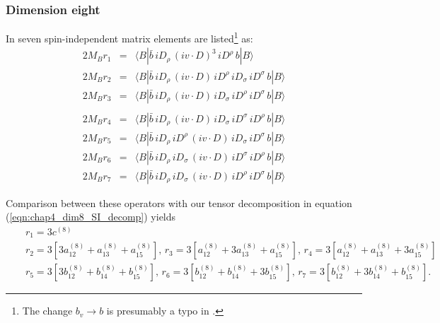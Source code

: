 \subsubsection{Dimension eight}\label{subsec:dim_8_SI_NRQCD}
\vspace{-0.2cm}
In \cite{Mannel:2010wj} seven spin-independent matrix elements are listed\footnote{The change $b_v\to b$ is presumably a typo in \cite{Mannel:2010wj}.} as:
\vspace{-0.4cm}
\begin{eqnarray}
2M_B r_1 &=& \langle B | \bar b \,i  D_\rho\, (i v \cdot D)^3\, i  D^\rho \, b | B \rangle\nonumber \\
2M_B r_2 &=& \langle B | \bar b \,i  D_\rho\, (i v \cdot D)\, i  D^\rho\, i  D_\sigma\, i  D^\sigma \, b | B \rangle\nonumber \\
\nonumber
2M_B r_3 &=& \langle B | \bar b \,i  D_\rho\, (i v \cdot D)\, i  D_\sigma\, i
D^\rho\, i  D^\sigma \, b | B \rangle\nonumber \\  
\nonumber
\end{eqnarray}
\begin{eqnarray}
2M_B r_4 &=& \langle B | \bar b \,i  D_\rho\, (i v \cdot D)\, i  D_\sigma\, i
D^\sigma\, i  D^\rho \, b | B \rangle\nonumber \\  
\nonumber
2M_B r_5 &=& \langle B | \bar b \,i  D_\rho\, i  D^\rho\,(i v \cdot D)\,  i
D_\sigma\, i  D^\sigma \, b | B \rangle \\  
\nonumber
2M_B r_6 &=& \langle B | \bar b \,i  D_\rho\, i  D_\sigma\, (i v \cdot D)\, i
D^\sigma\, i  D^\rho \, b | B \rangle \\  
2M_B r_7 &=& \langle B | \bar b \,i  D_\rho\, i  D_\sigma\, (i v \cdot D)\, i
D^\rho\, i  D^\sigma \, b | B \rangle
\end{eqnarray}

Comparison between these operators with our tensor decomposition in equation (\ref{eqn:chap4_dim8_SI_decomp}) yields
\vspace{-0.2cm}
\begin{eqnarray}
&&r_1=3c^{(8)}\nonumber\\
&&r_2=3\left[3a_{12}^{(8)}+a_{13}^{(8)}+a_{15}^{(8)}\right],\, r_3=3\left[a_{12}^{(8)}+3a_{13}^{(8)}+a_{15}^{(8)}\right],\, r_4=3\left[a_{12}^{(8)}+a_{13}^{(8)}+3a_{15}^{(8)}\right] \nonumber\\
&&r_5=3\left[3b_{12}^{(8)}+b_{14}^{(8)}+b_{15}^{(8)}\right],\, r_6=3\left[b_{12}^{(8)}+b_{14}^{(8)}+3b_{15}^{(8)}\right],\, r_7=3\left[b_{12}^{(8)}+3b_{14}^{(8)}+b_{15}^{(8)}\right].
\end{eqnarray}
